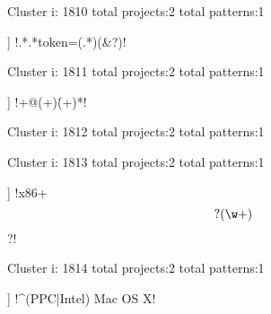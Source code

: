 Cluster i: 1810
total projects:2
total patterns:1
\begin{multicols}{1}
\begin{description}[noitemsep,topsep=0pt]
\item [[2] ] \cverb!.*\?.*token=(.*)(&?)!
\end{description}
\end{multicols}







Cluster i: 1811
total projects:2
total patterns:1
\begin{multicols}{1}
\begin{description}[noitemsep,topsep=0pt]
\item [[2] ] \cverb!\w+@(\w+)(\.\w+)*!
\end{description}
\end{multicols}







Cluster i: 1812
total projects:2
total patterns:1
\begin{multicols}{1}
\end{multicols}







Cluster i: 1813
total projects:2
total patterns:1
\begin{multicols}{1}
\begin{description}[noitemsep,topsep=0pt]
\item [[2] ] \cverb!x86\s+\[?(\w+)\]?!
\end{description}
\end{multicols}







Cluster i: 1814
total projects:2
total patterns:1
\begin{multicols}{1}
\begin{description}[noitemsep,topsep=0pt]
\item [[2] ] \cverb!^(PPC|Intel) Mac OS X!
\end{description}
\end{multicols}







